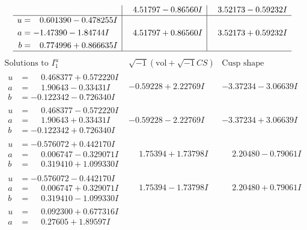 \documentclass[1p]{elsarticle_modified}
\theoremstyle{definition}
\newcommand{\I}{\sqrt{-1}}
\begin{document}
$$\begin{array}{c|c|c}
 & \phantom{-}4.51797 - 0.86560 I & \phantom{-}3.52173 - 0.59232 I \\ \hline\begin{aligned}
u &= \phantom{-}0.601390 - 0.478255 I \\
a &= -1.47390 - 1.84744 I \\
b &= \phantom{-}0.774996 + 0.866635 I\end{aligned}
 & \phantom{-}4.51797 + 0.86560 I & \phantom{-}3.52173 + 0.59232 I\\
 \hline 
 \end{array}$$\newpage$$\begin{array}{c|c|c}  
\text{Solutions to }I^u_{1}& \I (\text{vol} + \sqrt{-1}CS) & \text{Cusp shape}\\
 \hline 
\begin{aligned}
u &= \phantom{-}0.468377 + 0.572220 I \\
a &= \phantom{-}1.90643 - 0.33431 I \\
b &= -0.122342 - 0.726340 I\end{aligned}
 & -0.59228 + 2.22769 I & -3.37234 - 3.06639 I \\ \hline\begin{aligned}
u &= \phantom{-}0.468377 - 0.572220 I \\
a &= \phantom{-}1.90643 + 0.33431 I \\
b &= -0.122342 + 0.726340 I\end{aligned}
 & -0.59228 - 2.22769 I & -3.37234 + 3.06639 I \\ \hline\begin{aligned}
u &= -0.576072 + 0.442170 I \\
a &= \phantom{-}0.006747 - 0.329071 I \\
b &= \phantom{-}0.319410 + 1.099330 I\end{aligned}
 & \phantom{-}1.75394 + 1.73798 I & \phantom{-}2.20480 - 0.79061 I \\ \hline\begin{aligned}
u &= -0.576072 - 0.442170 I \\
a &= \phantom{-}0.006747 + 0.329071 I \\
b &= \phantom{-}0.319410 - 1.099330 I\end{aligned}
 & \phantom{-}1.75394 - 1.73798 I & \phantom{-}2.20480 + 0.79061 I \\ \hline\begin{aligned}
u &= \phantom{-}0.092300 + 0.677316 I \\
a &= \phantom{-}0.27605 + 1.89597 I \\

\end{aligned}
\end{array}$$
\end{document}
